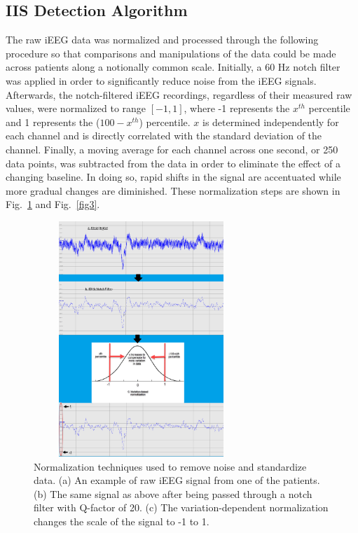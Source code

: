 \documentclass[letterpaper, 10pt, conference]{ieeeconf}      %
\begin{document}
\subsection{IIS Detection Algorithm}

The raw iEEG data was normalized and processed through the following procedure so that comparisons and manipulations of the data could be made across patients along a notionally common scale. Initially, a 60 Hz notch filter was applied in order to significantly reduce noise from the iEEG signals. Afterwards, the notch-filtered iEEG recordings, regardless of their measured raw values, were normalized to range $[-1, 1]$, where -1 represents the $x^{th}$ percentile and 1 represents the ($100-x^{th}$) percentile. $x$ is determined independently for each channel and is directly correlated with the standard deviation of the channel. Finally, a moving average for each channel across one second, or 250 data points, was subtracted from the data in order to eliminate the effect of a changing baseline.  In doing so, rapid shifts in the signal are accentuated while more gradual changes are diminished. These normalization steps are shown in Fig.~\ref{fig2} and Fig.~\ref{fig3}.

\begin{figure}[t!]
    \centering
    \includegraphics[height=3.5in, width=3.2in]{NormalizationTechniques.png}
    \caption{Normalization techniques used to remove noise and standardize data. (a) An example of raw iEEG signal from one of the patients. (b) The same signal as above after being passed through a notch filter with Q-factor of 20. (c) The variation-dependent normalization changes the scale of the signal to -1 to 1.}
    \label{fig2}
\end{figure}
\end{document}
